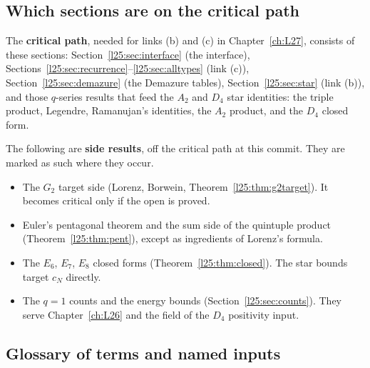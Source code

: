 \subsection{Which sections are on the critical path}

The \textbf{critical path}, needed for links (b) and (c) in Chapter~\ref{ch:L27}, consists of these sections:
Section~\ref{l25:sec:interface} (the interface), Sections~\ref{l25:sec:recurrence}--\ref{l25:sec:alltypes} (link (c)),
Section~\ref{l25:sec:demazure} (the Demazure tables), Section~\ref{l25:sec:star} (link (b)), and those $q$-series
results that feed the $A_2$ and $D_4$ star identities: the triple product, Legendre, Ramanujan's identities, the
$A_2$ product, and the $D_4$ closed form.

The following are \textbf{side results}, off the critical path at this commit. They are marked as such where they
occur.
\begin{itemize}
\item The $G_2$ target side (Lorenz, Borwein, Theorem~\ref{l25:thm:g2target}). It becomes critical only if the open
   is proved.
\item Euler's pentagonal theorem and the sum side of the quintuple product (Theorem~\ref{l25:thm:pent}), except as ingredients of
  Lorenz's formula.
\item The $E_6$, $E_7$, $E_8$ closed forms (Theorem~\ref{l25:thm:closed}). The star bounds target $c_N$ directly.
\item The $q=1$ counts and the energy bounds (Section~\ref{l25:sec:counts}). They serve Chapter~\ref{ch:L26} and the
   field of the $D_4$ positivity input.
\end{itemize}

\subsection{Glossary of terms and named inputs}\label{l25:sec:glossary}

